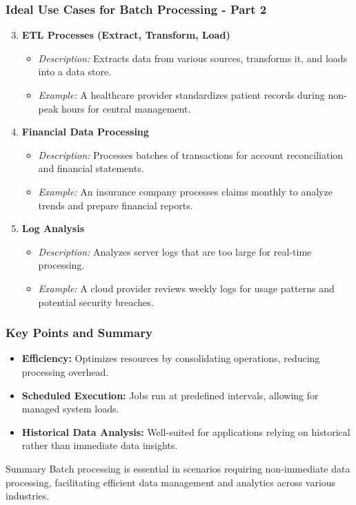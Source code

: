 \documentclass[aspectratio=169]{beamer}
\begin{document}
\begin{frame}[fragile]
    \frametitle{Ideal Use Cases for Batch Processing - Part 2}
    \begin{enumerate}
        \setcounter{enumi}{2} %
        \item \textbf{ETL Processes (Extract, Transform, Load)}
        \begin{itemize}
            \item \textit{Description:} Extracts data from various sources, transforms it, and loads into a data store.
            \item \textit{Example:} A healthcare provider standardizes patient records during non-peak hours for central management.
        \end{itemize}

        \item \textbf{Financial Data Processing}
        \begin{itemize}
            \item \textit{Description:} Processes batches of transactions for account reconciliation and financial statements.
            \item \textit{Example:} An insurance company processes claims monthly to analyze trends and prepare financial reports.
        \end{itemize}

        \item \textbf{Log Analysis}
        \begin{itemize}
            \item \textit{Description:} Analyzes server logs that are too large for real-time processing.
            \item \textit{Example:} A cloud provider reviews weekly logs for usage patterns and potential security breaches.
        \end{itemize}
    \end{enumerate}
\end{frame}

\begin{frame}[fragile]
    \frametitle{Key Points and Summary}
    \begin{itemize}
        \item \textbf{Efficiency:} Optimizes resources by consolidating operations, reducing processing overhead.
        \item \textbf{Scheduled Execution:} Jobs run at predefined intervals, allowing for managed system loads.
        \item \textbf{Historical Data Analysis:} Well-suited for applications relying on historical rather than immediate data insights.
    \end{itemize}
    
    \vspace{10pt}
    
    \begin{block}{Summary}
        Batch processing is essential in scenarios requiring non-immediate data processing, facilitating efficient data management and analytics across various industries.
    \end{block}
\end{frame}
\end{document}
